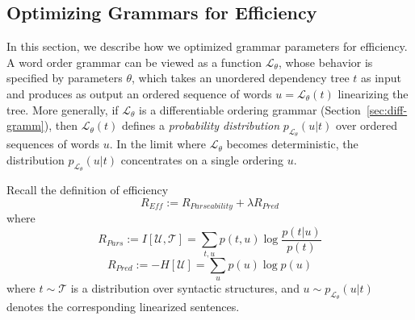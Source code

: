 \documentclass[10pt,twoside,lineno]{article}
\newcommand{\utterance}{\mathcal{U}}
\newcommand{\tree}{\mathcal{T}}
\begin{document}
\subsection{Optimizing Grammars for Efficiency}\label{sec:optim-eff}

In this section, we describe how we optimized grammar parameters for efficiency.
A word order grammar can be viewed as a function $\mathcal{L}_\theta$, whose behavior is specified by parameters $\theta$, which takes an unordered dependency tree $t$ as input and produces as output an ordered sequence of words $u = \mathcal{L}_\theta(t)$ linearizing the tree.
More generally, if $\mathcal{L}_\theta$ is a differentiable ordering grammar (Section~\ref{sec:diff-gramm}), then $\mathcal{L}_\theta(t)$ defines a \emph{probability distribution} $p_{\mathcal{L}_\theta}(u|t)$ over ordered sequences of words $u$.
In the limit where $\mathcal{L}_\theta$ becomes deterministic, the distribution $p_{\mathcal{L}_\theta}(u|t)$ concentrates on a single ordering $u$.

Recall the definition of efficiency
\begin{equation}\label{eq:efficiency-recall}
	R_{\textit{Eff}} := R_{\textit{Parseability}} + \lambda R_\textit{Pred}
\end{equation}
where
\begin{equation}\label{eq:rpars}
	R_{Pars} := I[\utterance,\tree] = \sum_{t,u} p(t,u) \log \frac{p(t|u)}{p(t)} 
\end{equation}
\begin{equation}
	R_{Pred} := - H[\utterance] = \sum_{u} p(u) \log p(u)
\end{equation}
where $t \sim \tree$ is a distribution over syntactic structures, and $u \sim p_{\mathcal{L}_\theta}(u|t)$ denotes the corresponding linearized sentences.
\end{document}
